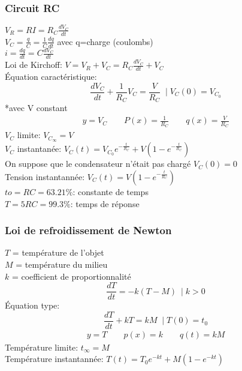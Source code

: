 \subsubsection*{Circuit RC}
$V_R = RI = R_C\frac{dV_C}{dt}$\\\vspace{5pt}
$V_C=\frac{q}{C} = \frac{1}{C}\frac{dq}{dt}$ avec q=charge (coulombs)\\\vspace{5pt}
$i=\frac{dq}{dt}=C\frac{dV_C}{dt}$\\\vspace{5pt}
Loi de Kirchoff: $V=V_R+V_C=R_C\frac{dV_C}{dt}+V_C$\\\vspace{5pt}
Équation caractéristique: \[\frac{dV_C}{dt}+\frac{1}{R_C}V_C=\frac{V}{R_C}\;\mid V_C(0)=V_{C_{0}}\]
*avec V constant\\
\begin{gather*}
    y=V_C \qquad P(x)=\frac{1}{R_C} \qquad q(x)=\frac{V}{R_C}
\end{gather*}
$V_C$ limite: \(V_{C_{\infty}} = V\)\\
$V_C$ instantanée: \(V_C(t)=V_{C_{0}}e^{-\frac{t}{R_C}}+V(1-e^{-\frac{t}{R_C}})\)\\
On suppose que le condensateur n'était pas chargé $V_C(0)=0$\\
Tension instantannée: \(V_C(t)=V(1-e^{-\frac{t}{R_C}})\)\\
$to=RC = 63.21\%$: constante de temps\\
$T=5RC=99.3\%$: temps de réponse

\subsubsection*{Loi de refroidissement de Newton}
$T$ = température de l'objet\\
$M$ = température du milieu\\
$k$ = coefficient de proportionnalité\\
\[\frac{dT}{dt}=-k(T-M) \:\mid  k>0\]
Équation type: \[\frac{dT}{dt}+kT=kM \;\mid T(0)=t_0\]
\begin{gather*}
 y=T \qquad   p(x)=k \qquad q(t)=kM
\end{gather*}
Température limite: $t_\infty=M$\\
Température instantannée: \(T(t)=T_0e^{-kt}+M(1-e^{-kt})\)\\

